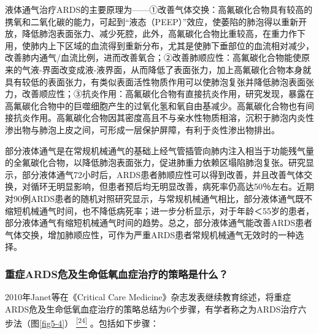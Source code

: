 液体通气治疗ARDS的主要原理为------①改善气体交换：高氟碳化合物具有较高的携氧和二氧化碳的能力，可起到“液态（PEEP）”效应，使萎陷的肺泡得以重新开放，降低肺泡表面张力、减少死腔，此外，高氟碳化合物比重较高，在重力作下用，使肺内上下区域的血流得到重新分布，尤其是使肺下垂部位的血流相对减少，改善肺内通气/血流比例，进而改善氧合；②改善肺顺应性：高氟碳化合物能使原来的气液-界面改变成液-液界面，从而降低了表面张力，加上高氟碳化合物本身就具有较低的表面张力，有类似表面活性物质作用可以使肺泡复张并降低肺泡表面张力，改善顺应性；③抗炎作用：高氟碳化合物有直接抗炎作用，研究发现，暴露在高氟碳化合物中的巨噬细胞产生的过氧化氢和氧自由基减少。高氟碳化合物也有间接抗炎作用。高氟碳化合物因其密度高且不与亲水性物质相溶，沉积于肺泡内炎性渗出物与肺泡上皮之间，可形成一层保护屏障，有利于炎性渗出物排出。

部分液体通气是在常规机械通气的基础上经气管插管向肺内注入相当于功能残气量的全氟碳化合物，以降低肺泡表面张力，促进肺重力依赖区塌陷肺泡复张。研究显示，部分液体通气72小时后，ARDS患者肺顺应性可以得到改善，并且改善气体交换，对循环无明显影响，但患者预后均无明显改善，病死率仍高达50％左右。近期对90例ARDS患者的随机对照研究显示，与常规机械通气相比，部分液体通气既不缩短机械通气时间，也不降低病死率；进一步分析显示，对于年龄＜55岁的患者，部分液体通气有缩短机械通气时间的趋势。总之，部分液体通气能改善ARDS患者气体交换，增加肺顺应性，可作为严重ARDS患者常规机械通气无效时的一种选择。

\subsubsection{重症ARDS危及生命低氧血症治疗的策略是什么？}

2010年Janet等在《Critical Care
Medicine》杂志发表继续教育综述，将重症ARDS危及生命低氧血症治疗的策略总结为6个步骤，有学者称之为ARDS治疗六步法（图\ref{fig5-4}）
\protect\hyperlink{text00011.htmlux5cux23ch24-10}{\textsuperscript{{[}24{]}}}
。包括如下步骤：

